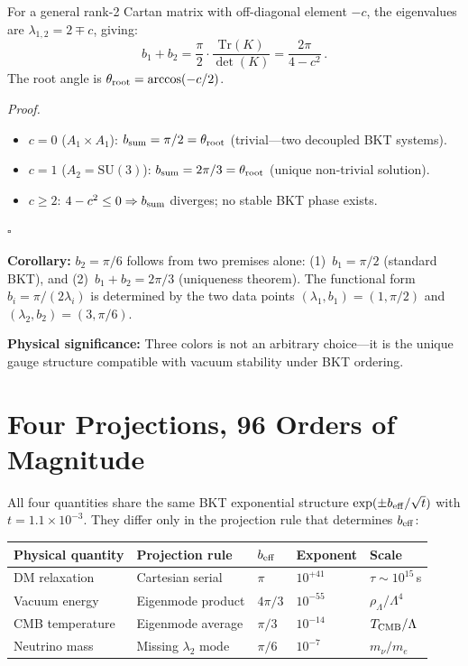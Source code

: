 \documentclass[twocolumn,preprintnumbers,amsmath,amssymb,prd]{revtex4-2}
\begin{document}
For a general rank-2 Cartan matrix with off-diagonal element $-c$, the eigenvalues are $\lambda_{1,2} = 2 \mp c$, giving:
\begin{equation}
b_1 + b_2 = \frac{\pi}{2}\cdot\frac{\mathrm{Tr}(K)}{\det(K)} = \frac{2\pi}{4-c^2}\,.
\label{eq:bsum}
\end{equation}
The root angle is $\theta_{\rm root} = \arccos(-c/2)$.

\emph{Proof.}
\begin{itemize}
\item $c = 0$ ($A_1 \times A_1$): $b_{\rm sum} = \pi/2 = \theta_{\rm root}$ (trivial---two decoupled BKT systems).
\item $c = 1$ ($A_2 = \mathrm{SU}(3)$): $b_{\rm sum} = 2\pi/3 = \theta_{\rm root}$ (unique non-trivial solution).
\item $c \geq 2$: $4 - c^2 \leq 0 \Rightarrow b_{\rm sum}$ diverges; no stable BKT phase exists.
\end{itemize}
\hfill$\square$

\textbf{Corollary:} $b_2 = \pi/6$ follows from two premises alone: (1)~$b_1 = \pi/2$ (standard BKT), and (2)~$b_1 + b_2 = 2\pi/3$ (uniqueness theorem).
The functional form $b_i = \pi/(2\lambda_i)$ is determined by the two data points $(\lambda_1, b_1) = (1, \pi/2)$ and $(\lambda_2, b_2) = (3, \pi/6)$.

\textbf{Physical significance:} Three colors is not an arbitrary choice---it is the unique gauge structure compatible with vacuum stability under BKT ordering.

\section{Four Projections, 96 Orders of Magnitude}
\label{sec:four_projections}

All four quantities share the same BKT exponential structure $\exp(\pm b_{\rm eff}/\sqrt{t})$ with $t = 1.1\times10^{-3}$.
They differ only in the projection rule that determines $b_{\rm eff}$:

\begin{center}
\begin{tabular}{lllll}
\toprule
Physical quantity & Projection rule & $b_{\rm eff}$ & Exponent & Scale \\
\midrule
DM relaxation & Cartesian serial & $\pi$ & $10^{+41}$ & $\tau \sim 10^{15}\,$s \\
Vacuum energy & Eigenmode product & $4\pi/3$ & $10^{-55}$ & $\rho_\Lambda/\Lambda^4$ \\
CMB temperature & Eigenmode average & $\pi/3$ & $10^{-14}$ & $T_{\rm CMB}/\Lambda$ \\
Neutrino mass & Missing $\lambda_2$ mode & $\pi/6$ & $10^{-7}$ & $m_\nu/m_e$ \\
\bottomrule
\end{tabular}
\end{center}
\end{document}
